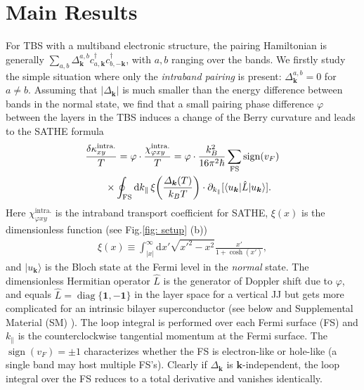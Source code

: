 \section{Main Results}
For TBS with a multiband electronic structure, the pairing Hamiltonian is generally $\sum_{a,b} \varDelta_{\bm{k}}^{a,b} c^\dagger_{a,\bm{k}} c^\dagger_{b,-\bm{k}}$, with $a,b$ ranging over the bands. We firstly study the simple situation where only the \emph{intraband pairing} is present: $\varDelta_{\bm{k}}^{a,b}=0$ for $a\neq b$. Assuming that $|\varDelta_{\bm{k}}|$ is much smaller than the energy difference between bands in the normal state,  we find that a small pairing phase difference $\varphi$ between the layers in the TBS induces a change of the Berry curvature and leads to the SATHE formula
\begin{align}
    & \frac{\delta\kappa_{xy}^{\text{intra.}}}{T} = \varphi\cdot \frac{\chi_{\varphi xy}^{\text{intra.}}}{T} =\varphi \cdot\frac{k_B^2}{16\pi^2\hbar} \sum_{\text{FS}}\mathop{\mathrm{sign}}(v_F)\notag\\
	&\qquad\times\oint_{\text{FS}}{\mathrm d} k_\parallel\,\xi\bigg(\frac{\varDelta_{\bm{k}}(T)}{k_BT}\bigg)\cdot\partial_{k_\parallel} [\langle u_{\bm{k}}|\hat L|u_{\bm{k}}\rangle] .  \label{eq:main_result}
\end{align}
Here $\chi_{\varphi xy}^{\text{intra.}}$ is the intraband transport coefficient for SATHE, $\xi(x)$ is the dimensionless function (see Fig.\ref{fig: setup} (b))
\begin{align}\label{eq:xi}
	\xi(x)\equiv\int_{|x|}^\infty\mathrm{d}x' \sqrt{x'^2-x^2}\frac{x'}{1+\cosh(x')},
\end{align}
and $|u_{\bm{k}}\rangle$ is the Bloch state at the Fermi level in the \emph{normal} state. The dimensionless Hermitian operator $\hat L$ is the generator of Doppler shift due to $\varphi$, and equals $\hat L=\mathop{\mathrm{diag}}\{\mathbf{1},\mathbf{-1}\}$ in the layer space  for a vertical JJ but gets more complicated for an intrinsic bilayer superconductor (see below and Supplemental Material (SM) \cite{SM}). The loop integral is performed over each Fermi surface (FS) and $k_\parallel$ is the counterclockwise tangential momentum at the Fermi surface. The $\mathop{\mathrm{sign}}(v_F)=\pm 1$ characterizes whether the FS is electron-like or hole-like (a single band may host multiple FS's). Clearly if $\varDelta_{\bm{k}}$ is $\bm{k}$-independent, the loop integral over the FS reduces to a total derivative and vanishes identically.

